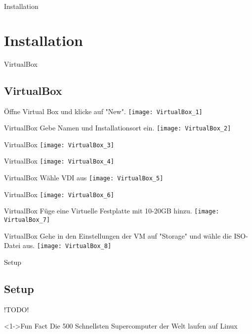 
\begin{frame}{Installation}
    \section{Installation}\label{sec:installation}
\end{frame}

\begin{frame}{VirtualBox}
    \subsection{VirtualBox}\label{subsec:VirtualBox}
    Öffne Virtual Box und klicke auf "New".
    \texttt{[image: VirtualBox\_1]}
\end{frame}

\begin{frame}{VirtualBox}
    Gebe Namen und Installationsort ein.
    \texttt{[image: VirtualBox\_2]}
\end{frame}

\begin{frame}{VirtualBox}
    \texttt{[image: VirtualBox\_3]}
\end{frame}

\begin{frame}{VirtualBox}
    \texttt{[image: VirtualBox\_4]}
\end{frame}

\begin{frame}{VirtualBox}
    Wähle VDI aus
    \texttt{[image: VirtualBox\_5]}
\end{frame}

\begin{frame}{VirtualBox}
    \texttt{[image: VirtualBox\_6]}
\end{frame}

\begin{frame}{VirtualBox}
    Füge eine Virtuelle Festplatte mit 10-20GB hinzu.
    \texttt{[image: VirtualBox\_7]}
\end{frame}

\begin{frame}{VirtualBox}
    Gehe in den Einstellungen der VM auf "Storage" und wähle die ISO-Datei aus.
    \texttt{[image: VirtualBox\_8]}
\end{frame}

\begin{frame}{Setup}
    \subsection{Setup}\label{subsec:setup}

    !TODO!

    \begin{exampleblock}<1->{Fun Fact}
        Die 500 Schnellsten Supercomputer der Welt laufen auf Linux
    \end{exampleblock}

\end{frame}